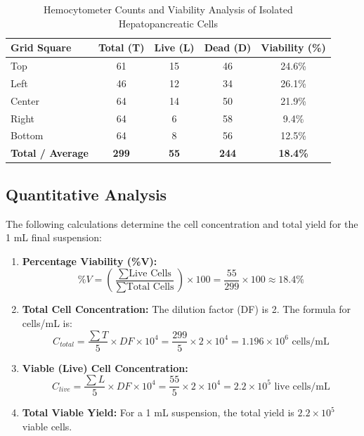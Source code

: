 \documentclass[a4paper]{article}
\begin{document}
\begin{table}[htbp]
\centering
\caption{Hemocytometer Counts and Viability Analysis of Isolated Hepatopancreatic Cells}
\label{tab:viability}
\setlength{\tabcolsep}{12pt}
\renewcommand{\arraystretch}{1.2}
\begin{tabular}{lcccc}
\toprule
\textbf{Grid Square} & \textbf{Total (T)} & \textbf{Live (L)} & \textbf{Dead (D)} & \textbf{Viability (\%)} \\
\midrule
Top    & 61  & 15 & 46  & 24.6\% \\
Left   & 46  & 12 & 34  & 26.1\% \\
Center & 64  & 14 & 50  & 21.9\% \\
Right  & 64  & 6  & 58  & 9.4\% \\
Bottom & 64  & 8  & 56  & 12.5\% \\
\midrule
\textbf{Total / Average} & \textbf{299} & \textbf{55} & \textbf{244} & \textbf{18.4\%} \\
\bottomrule
\end{tabular}
\end{table}

\subsection{Quantitative Analysis}
The following calculations determine the cell concentration and total yield for the 1 mL final suspension:
\begin{enumerate}[leftmargin=*]
    \item \textbf{Percentage Viability (\%V):}
    \begin{equation}
    \%V = \left( \frac{\sum \text{Live Cells}}{\sum \text{Total Cells}} \right) \times 100 = \frac{55}{299} \times 100 \approx 18.4\%
    \end{equation}

    \item \textbf{Total Cell Concentration:}
    The dilution factor (DF) is 2. The formula for cells/mL is:
    \begin{equation}
    C_{total} = \frac{\sum T}{5} \times DF \times 10^4 = \frac{299}{5} \times 2 \times 10^4 = 1.196 \times 10^6 \text{ cells/mL}
    \end{equation}

    \item \textbf{Viable (Live) Cell Concentration:}
    \begin{equation}
    C_{live} = \frac{\sum L}{5} \times DF \times 10^4 = \frac{55}{5} \times 2 \times 10^4 = 2.2 \times 10^5 \text{ live cells/mL}
    \end{equation}

    \item \textbf{Total Viable Yield:}
    For a 1 mL suspension, the total yield is $2.2 \times 10^5$ viable cells.
\end{enumerate}
\end{document}
